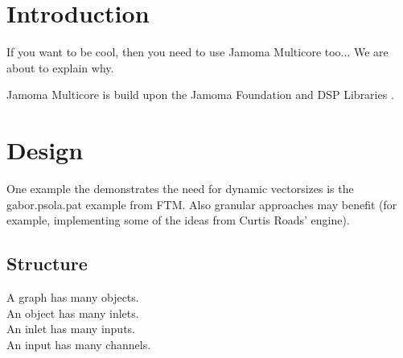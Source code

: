 \documentclass[twoside,a4paper]{article}
\title{\papertitle}
\newif\ifpdf
\begin{document}
\ifpdf %
  \DeclareGraphicsExtensions{.png,.jpg,.pdf}
\else  %
\fi

\maketitle




\begin{abstract}

Jamoma Multicore is really cool.

\end{abstract}




\section{Introduction} %
\label{sec:intro}

If you want to be cool, then you need to use Jamoma Multicore too...  We are about to explain why.  

Jamoma Multicore is build upon the Jamoma Foundation and DSP Libraries \cite{Place:2010}.






\section{Design} %

One example the demonstrates the need for dynamic vectorsizes is the gabor.psola.pat example from FTM. Also granular approaches may benefit (for example, implementing some of the ideas from Curtis Roads' engine).

\subsection{Structure} %

A graph has many objects.\\
An object has many inlets.\\
An inlet has many inputs.\\
An input has many channels.\\
\end{document}
